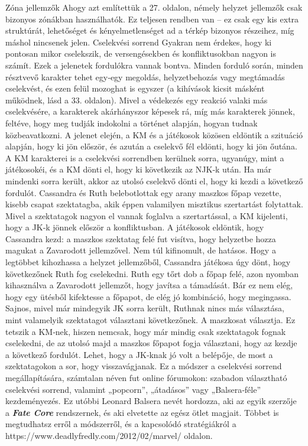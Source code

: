 \documentclass[oneside]{book}
\newcommand{\fate}[1]{\textbf{\textit{#1}}}
\begin{document}
Zóna jellemzők
Ahogy azt említettük a 27. oldalon, némely helyzet jellemzők csak bizonyos zónákban használhatók. Ez teljesen rendben van – ez csak egy kis extra struktúrát, lehetőséget és kényelmetlenséget ad a térkép bizonyos részeihez, míg máshol nincsenek jelen.
Cselekvési sorrend
Gyakran nem érdekes, hogy ki pontosan mikor cselekszik, de versengésekben és konfliktusokban nagyon is számít. Ezek a jelenetek fordulókra vannak bontva. Minden forduló során, minden résztvevő karakter tehet egy‑egy megoldás, helyzetbehozás vagy megtámadás cselekvést, és ezen felül mozoghat is egyszer (a kihívások kicsit másként működnek, lásd a 33. oldalon). Mivel a védekezés egy reakció valaki más cselekvésére, a karakterek akárhányszor képesek rá, míg más karakterek jönnek, feltéve, hogy meg tudják indokolni a történet alapján, hogyan tudnak közbeavatkozni.
A jelenet elején, a KM és a játékosok közösen eldöntik a szituáció alapján, hogy ki jön először, és azután a cselekvő fél eldönti, hogy ki jön őutána. A KM karakterei is a cselekvési sorrendben kerülnek sorra, ugyanúgy, mint a játékosokéi, és a KM dönti el, hogy ki következik az NJK‑k után. Ha már mindenki sorra került, akkor az utolsó cselekvő dönti el, hogy ki kezdi a következő fordulót.
Cassandra és Ruth belebotlottak egy arany maszkos főpap vezette, kisebb csapat szektatagba, akik éppen valamilyen misztikus szertartást folytattak. Mivel a szektatagok nagyon el vannak foglalva a szertartással, a KM kijelenti, hogy a JK‑k jönnek először a konfliktusban. A játékosok eldöntik, hogy Cassandra kezd: a maszkos szektatag felé fut visítva, hogy helyzetbe hozza magukat a Zavarodott jellemzővel. Nem túl kifinomult, de hatásos. Hogy a legtöbbet kihozhassa a helyzet jellemzőből, Cassandra játékosa úgy dönt, hogy következőnek Ruth fog cselekedni. Ruth egy tőrt dob a főpap felé, azon nyomban kihasználva a Zavarodott jellemzőt, hogy javítsa a támadását. Bár ez nem elég, hogy egy ütésből kifektesse a főpapot, de elég jó kombináció, hogy megingassa.
Sajnos, mivel már mindegyik JK sorra került, Ruthnak nincs más választása, mint valamelyik szektatagot választani következőnek. A maszkosat választja. Ez tetszik a KM‑nek, hiszen nemcsak, hogy már mindig csak szektatagok fognak cselekedni, de az utolsó majd a maszkos főpapot fogja választani, hogy az kezdje a következő fordulót. Lehet, hogy a JK‑knak jó volt a belépője, de most a szektatagokon a sor, hogy visszavágjanak.
Ez a módszer a cselekvési sorrend megállapítására, számtalan néven fut online fórumokon: szabadon választható cselekvési sorrend, valamint „popcorn”, „átadásos” vagy „Balsera‑féle” kezdeményezés. Ez utóbbi Leonard Balsera nevét hordozza, aki az egyik szerzője a \fate{Fate Core} rendszernek, és aki elvetette az egész ötlet magjait. Többet is megtudhatsz erről a módszerről, és a kapcsolódó stratégiákról a https://www.deadlyfredly.com/2012/02/marvel/ oldalon.
\end{document}
